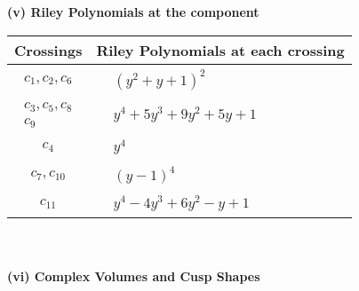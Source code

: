 \documentclass[1p]{elsarticle_modified}
\theoremstyle{definition}
\begin{document}
\newpage\renewcommand{\arraystretch}{1}
\flushleft \textbf{(v) Riley Polynomials at the component}\newline \\
\begin{tabular}{m{50pt}|m{274pt}}
Crossings & \hspace{64pt}Riley Polynomials at each crossing \\
\hline $$\begin{aligned}c_{1},c_{2},c_{6}\end{aligned}$$&$\begin{aligned}
&(y^2+y+1)^2
\end{aligned}$\\
\hline $$\begin{aligned}c_{3},c_{5},c_{8}\\c_{9}\end{aligned}$$&$\begin{aligned}
&y^4+5 y^3+9 y^2+5 y+1
\end{aligned}$\\
\hline $$\begin{aligned}c_{4}\end{aligned}$$&$\begin{aligned}
&y^4
\end{aligned}$\\
\hline $$\begin{aligned}c_{7},c_{10}\end{aligned}$$&$\begin{aligned}
&(y-1)^4
\end{aligned}$\\
\hline $$\begin{aligned}c_{11}\end{aligned}$$&$\begin{aligned}
&y^4-4 y^3+6 y^2- y+1
\end{aligned}$\\
\hline
\end{tabular}\\~\\
\newpage\flushleft \textbf{(vi) Complex Volumes and Cusp Shapes}
\end{document}
